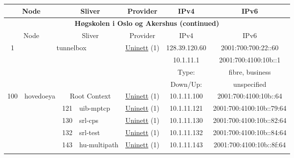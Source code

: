 \begin{small}
\begin{center}
\begin{longtable}{|c|c|c|c|c|c|c|c|}
 \multicolumn{2}{|p{8em}|}{Node} & \multicolumn{2}{|p{8em}|}{Sliver} & \multicolumn{2}{|p{8em}|}{Provider} & IPv4 & IPv6 \\ \hline
\endfirsthead
\hline
 \multicolumn{8}{|c|}{\textbf{Høgskolen i Oslo og Akershus (continued)}} \\ \hline
 \multicolumn{2}{|p{8em}|}{Node} & \multicolumn{2}{|p{8em}|}{Sliver} & \multicolumn{2}{|p{8em}|}{Provider} & IPv4 & IPv6 \\ \hline
\endhead
 \multirow{4}{*}{\tiny{1}} & \multicolumn{3}{|c|}{\multirow{4}{*}{\tiny{tunnelbox}}} & \multicolumn{2}{|c|}{\multirow{4}{*}{\tiny{\href{https://www.uninett.no}{Uninett} (1)}}} & \tiny{128.39.120.60} & \tiny{2001:700:700:22::60} \\* \cline{7-7}\cline{8-8}
  & \multicolumn{3}{|c|}{} & \multicolumn{2}{|c|}{} & \tiny{10.1.11.1} & \tiny{2001:700:4100:10b::1} \\* \cline{7-7}\cline{8-8}
  & \multicolumn{3}{|c|}{} & \multicolumn{2}{|c|}{} & Type: & fibre, business \\* \cline{7-7}\cline{8-8}
  & \multicolumn{3}{|c|}{} & \multicolumn{2}{|c|}{} & Down/Up:  & unspecified \\ \hline
 \multirow{8}{*}{\tiny{100}} & \multicolumn{1}{|l|}{\multirow{8}{*}{\tiny{hovedoeya}}} & \multicolumn{2}{|c|}{\tiny{Root Context}} & \multicolumn{2}{|c|}{\tiny{\href{https://www.uninett.no}{Uninett} (1)}} & \tiny{10.1.11.100} & \tiny{2001:700:4100:10b::64} \\* \cline{3-3}\cline{4-4}\cline{5-5}\cline{6-6}\cline{7-7}\cline{8-8}
  &  & \tiny{121} & \multicolumn{1}{|l|}{\tiny{uib-mptcp}} & \multicolumn{2}{|c|}{\tiny{\href{https://www.uninett.no}{Uninett} (1)}} & \tiny{10.1.11.121} & \tiny{2001:700:4100:10b::79:64} \\* \cline{3-3}\cline{4-4}\cline{5-5}\cline{6-6}\cline{7-7}\cline{8-8}
  &  & \tiny{130} & \multicolumn{1}{|l|}{\tiny{srl-cps}} & \multicolumn{2}{|c|}{\tiny{\href{https://www.uninett.no}{Uninett} (1)}} & \tiny{10.1.11.130} & \tiny{2001:700:4100:10b::82:64} \\* \cline{3-3}\cline{4-4}\cline{5-5}\cline{6-6}\cline{7-7}\cline{8-8}
  &  & \tiny{132} & \multicolumn{1}{|l|}{\tiny{srl-test}} & \multicolumn{2}{|c|}{\tiny{\href{https://www.uninett.no}{Uninett} (1)}} & \tiny{10.1.11.132} & \tiny{2001:700:4100:10b::84:64} \\* \cline{3-3}\cline{4-4}\cline{5-5}\cline{6-6}\cline{7-7}\cline{8-8}
  &  & \tiny{143} & \multicolumn{1}{|l|}{\tiny{hu-multipath}} & \multicolumn{2}{|c|}{\tiny{\href{https://www.uninett.no}{Uninett} (1)}} & \tiny{10.1.11.143} & \tiny{2001:700:4100:10b::8f:64} \\* \cline{3-3}\cline{4-4}\cline{5-5}\cline{6-6}\cline{7-7}\cline{8-8}

\end{longtable}
\end{center}
\end{small}
